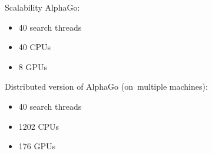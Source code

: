 \documentclass{beamer}
\begin{document}
{\begin{frame}{Scalability}
      AlphaGo:
      \begin{itemize}
        \item 40 search threads
        \item 40 CPUs
        \item 8 GPUs
      \end{itemize}
      \pause

      Distributed version of AlphaGo (on~multiple machines):
      \begin{itemize}
        \item 40 search threads
        \item 1202 CPUs
        \item 176 GPUs
      \end{itemize}
    \end{frame}

  }
\end{document}
